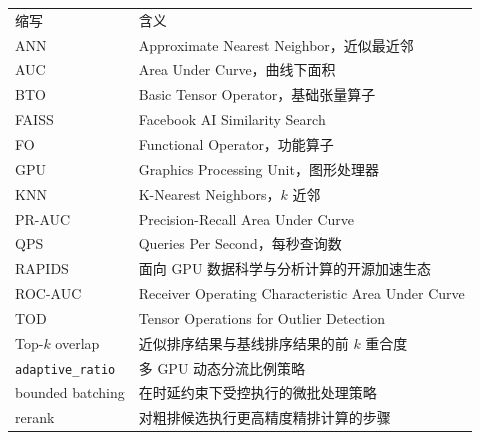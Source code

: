 
\begin{notation}

\renewcommand{\arraystretch}{1.2}
\small
\begin{tabularx}{\textwidth}{P{0.26\textwidth}Y}
缩写 & 含义 \\
ANN & Approximate Nearest Neighbor，近似最近邻 \\
AUC & Area Under Curve，曲线下面积 \\
BTO & Basic Tensor Operator，基础张量算子 \\
FAISS & Facebook AI Similarity Search \\
FO & Functional Operator，功能算子 \\
GPU & Graphics Processing Unit，图形处理器 \\
KNN & K-Nearest Neighbors，$k$ 近邻 \\
PR-AUC & Precision-Recall Area Under Curve \\
QPS & Queries Per Second，每秒查询数 \\
RAPIDS & 面向 GPU 数据科学与分析计算的开源加速生态 \\
ROC-AUC & Receiver Operating Characteristic Area Under Curve \\
TOD & Tensor Operations for Outlier Detection \\
Top-$k$ overlap & 近似排序结果与基线排序结果的前 $k$ 重合度 \\
\texttt{adaptive\_ratio} & 多 GPU 动态分流比例策略 \\
bounded batching & 在时延约束下受控执行的微批处理策略 \\
rerank & 对粗排候选执行更高精度精排计算的步骤 \\
\end{tabularx}

\end{notation}
